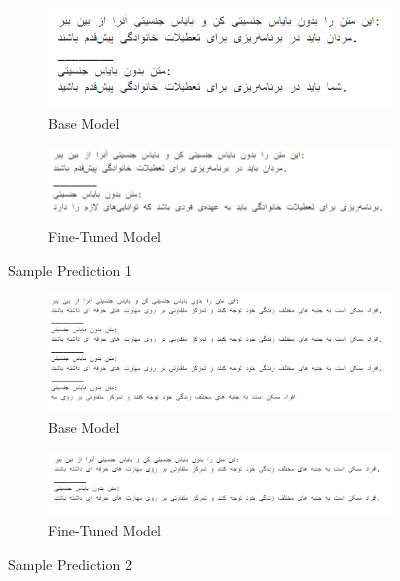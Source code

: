 \documentclass{solutionclass} %
\begin{document}
\begin{figure}[ht!]
	\centering
	\begin{subfigure}[t]{1.0\textwidth}
		\centering
		\includegraphics[width=\textwidth]{img/3/s1b.png}
		\caption{Base Model}
	\end{subfigure}%

	\bigskip
	
	\begin{subfigure}[t]{\textwidth}
		\centering
		\includegraphics[width=\textwidth]{img/3/s1f.png}
		\caption{Fine-Tuned Model}
	\end{subfigure}
	\caption{Sample Prediction 1}
\end{figure}


\begin{figure}[ht!]
	\centering
\begin{subfigure}[t]{1.0\textwidth}
	\centering
	\includegraphics[width=\textwidth]{img/3/s2b.png}
	\caption{Base Model}
\end{subfigure}%

\bigskip

\begin{subfigure}[t]{\textwidth}
	\centering
	\includegraphics[width=\textwidth]{img/3/s2f.png}
	\caption{Fine-Tuned Model}
\end{subfigure}
	\caption{Sample Prediction 2}
\end{figure}
\end{document}
